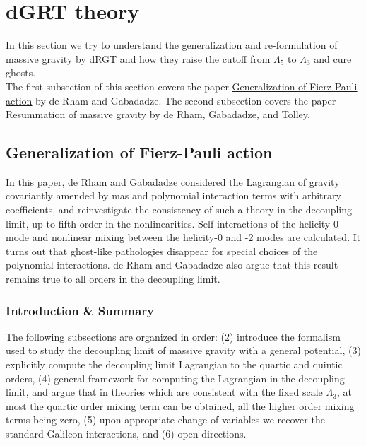 \documentclass{book}
\theoremstyle{definition}
\begin{document}
\newpage



\section{dGRT theory}




In this section we try to understand the generalization and re-formulation of massive gravity by dRGT and how they raise the cutoff from $\Lambda_5$ to $\Lambda_3$ and cure ghosts. \\

The first subsection of this section covers the paper \href{https://arxiv.org/pdf/1007.0443.pdf}{\underline{Generalization of Fierz-Pauli action}} by de Rham and Gabadadze. The second subsection covers the paper \href{https://arxiv.org/pdf/1011.1232.pdf}{\underline{Resummation of massive gravity}} by de Rham, Gabadadze, and Tolley. 



\subsection{Generalization of Fierz-Pauli action}


In this paper, de Rham and Gabadadze considered the Lagrangian of gravity covariantly amended by mas and polynomial interaction terms with arbitrary coefficients, and reinvestigate the consistency of such a theory in the decoupling limit, up to fifth order in the nonlinearities. Self-interactions of the helicity-0 mode and nonlinear mixing between the helicity-0 and -2 modes are calculated. It turns out that ghost-like pathologies disappear for special choices of the polynomial interactions. de Rham and Gabadadze also argue that this result remains true to all orders in the decoupling limit.  








\subsubsection{Introduction \& Summary}

The following subsections are organized in order: (2) introduce the formalism used to study the decoupling limit of massive gravity with a general potential, (3) explicitly compute the decoupling limit Lagrangian to the quartic and quintic orders, (4) general framework for computing the Lagrangian in the decoupling limit, and argue that in theories which are consistent with the fixed scale $\Lambda_3$, at most the quartic order mixing term can be obtained, all the higher order mixing terms being zero, (5) upon appropriate change of variables we recover the standard Galileon interactions, and (6) open directions. 
 
\end{document}
